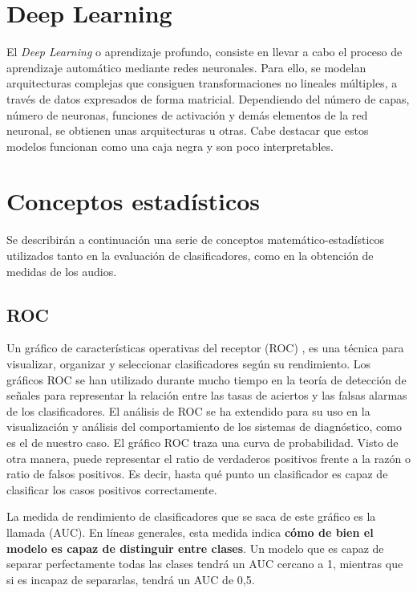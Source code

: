 \section{Deep Learning}
El \textit{Deep Learning} o aprendizaje profundo, consiste en llevar a cabo el proceso de aprendizaje automático mediante redes neuronales. Para ello, se modelan arquitecturas complejas que consiguen transformaciones no lineales múltiples, a través de datos expresados de forma matricial. Dependiendo del número de capas, número de neuronas, funciones de activación y demás elementos de la red neuronal, se obtienen unas arquitecturas u otras. Cabe destacar que estos modelos funcionan como una caja negra y son poco interpretables.

\section{Conceptos estadísticos}
Se describirán a continuación una serie de conceptos matemático-estadísticos utilizados tanto en la evaluación de clasificadores, como en la obtención de medidas de los audios.
\subsection{ROC}
Un gráfico de características operativas del receptor (ROC) \cite{roc}, es una técnica para visualizar, organizar y seleccionar clasificadores según su rendimiento. Los gráficos ROC se han utilizado durante mucho tiempo en la teoría de detección de señales para representar la relación entre las tasas de aciertos y las falsas alarmas de los clasificadores. El análisis de ROC se ha extendido para su uso en la visualización y análisis del comportamiento de los sistemas de diagnóstico, como es el de nuestro caso. El gráfico ROC traza una curva de probabilidad. Visto de otra manera, puede representar el ratio de verdaderos positivos frente a la razón o ratio de falsos positivos. Es decir, hasta qué punto un clasificador es capaz de clasificar los casos positivos correctamente.

La medida de rendimiento de clasificadores que se saca de este gráfico es la llamada  (AUC). En líneas generales, esta medida indica \textbf{cómo de bien el modelo es capaz de distinguir entre clases}.  Un modelo que es capaz de separar perfectamente todas las clases tendrá un AUC cercano a 1, mientras que si es incapaz de separarlas, tendrá un AUC de 0,5. 




